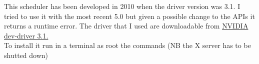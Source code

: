 \documentclass[a4paper,13pt]{article}
\begin{document}
\begin{multicols}{2}
    This scheduler has been developed in 2010 when the driver version was 3.1. I tried to use it with the most recent 5.0 but given a possible change to the APIs it returns a runtime error.
    The driver that I used are downloadable from \href{https://mega.co.nz/#!g49wnBaR!eVaf8DeGmDyPUV8VoJMtHRAHXDE4_-EWxwrmL6LCHWY}{NVIDIA dev-driver 3.1.}\\
    To install it run in a terminal as root the commands (NB the X server has to be shutted down)
  \lstset{
      basicstyle=\ttfamily\footnotesize,
          breaklines=true,
          tabsize=2,
          showspaces=false,
          showstringspaces=false,
          framexleftmargin=5pt,
          framexrightmargin=5pt,
          framexbottommargin=5pt,
          framextopmargin=5pt,
  }
   

\end{multicols}
\end{document}
